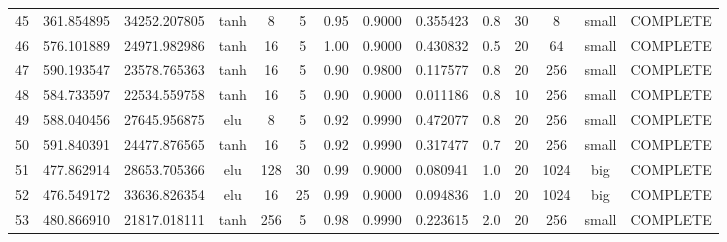 \begin{longtable}{cccccccccccccc}
                       45 &                 361.854895 &                       34252.207805 &            tanh &           8 &              5 &        0.95 & 0.9000 &       0.355423 &             0.8 &                 30 &        8 &     small & COMPLETE \\
                       46 &                 576.101889 &                       24971.982986 &            tanh &          16 &              5 &        1.00 & 0.9000 &       0.430832 &             0.5 &                 20 &       64 &     small & COMPLETE \\
                       47 &                 590.193547 &                       23578.765363 &            tanh &          16 &              5 &        0.90 & 0.9800 &       0.117577 &             0.8 &                 20 &      256 &     small & COMPLETE \\
                       48 &                 584.733597 &                       22534.559758 &            tanh &          16 &              5 &        0.90 & 0.9000 &       0.011186 &             0.8 &                 10 &      256 &     small & COMPLETE \\
                       49 &                 588.040456 &                       27645.956875 &             elu &           8 &              5 &        0.92 & 0.9990 &       0.472077 &             0.8 &                 20 &      256 &     small & COMPLETE \\
                       50 &                 591.840391 &                       24477.876565 &            tanh &          16 &              5 &        0.92 & 0.9990 &       0.317477 &             0.7 &                 20 &      256 &     small & COMPLETE \\
                       51 &                 477.862914 &                       28653.705366 &             elu &         128 &             30 &        0.99 & 0.9000 &       0.080941 &             1.0 &                 20 &     1024 &       big & COMPLETE \\
                       52 &                 476.549172 &                       33636.826354 &             elu &          16 &             25 &        0.99 & 0.9000 &       0.094836 &             1.0 &                 20 &     1024 &       big & COMPLETE \\
                       53 &                 480.866910 &                       21817.018111 &            tanh &         256 &              5 &        0.98 & 0.9990 &       0.223615 &             2.0 &                 20 &      256 &     small & COMPLETE \\

\end{longtable}
